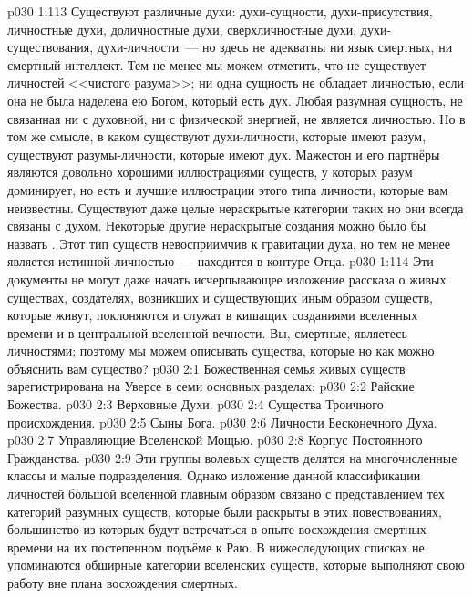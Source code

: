 \vs p030 1:113 Существуют различные духи: духи\hyp{}сущности, духи\hyp{}присутствия, личностные духи, доличностные духи, сверхличностные духи, духи\hyp{}существования, духи\hyp{}личности~--- но здесь не адекватны ни язык смертных, ни смертный интеллект. Тем не менее мы можем отметить, что не существует личностей <<чистого разума>>; ни одна сущность не обладает личностью, если она не была наделена ею Богом, который есть дух. Любая разумная сущность, не связанная ни с духовной, ни с физической энергией, не является личностью. Но в том же смысле, в каком существуют духи\hyp{}личности, которые имеют разум, существуют разумы\hyp{}личности, которые имеют дух. Мажестон и его партнёры являются довольно хорошими иллюстрациями существ, у которых разум доминирует, но есть и лучшие иллюстрации этого типа личности, которые вам неизвестны. Существуют даже целые нераскрытые категории таких  но они всегда связаны с духом. Некоторые другие нераскрытые создания можно было бы назвать . Этот тип существ невосприимчив к гравитации духа, но тем не менее является истинной личностью~--- находится в контуре Отца.
\vs p030 1:114 \pc Эти документы не могут даже начать исчерпывающее изложение рассказа о живых существах, создателях, возникших и существующих иным образом существ, которые живут, поклоняются и служат в кишащих созданиями вселенных времени и в центральной вселенной вечности. Вы, смертные, являетесь личностями; поэтому мы можем описывать существа, которые  но как можно объяснить вам  существо?
\vs p030 2:1 Божественная семья живых существ зарегистрирована на Уверсе в семи основных разделах:
\vs p030 2:2 Райские Божества.
\vs p030 2:3 Верховные Духи.
\vs p030 2:4 Существа Троичного происхождения.
\vs p030 2:5 Сыны Бога.
\vs p030 2:6 Личности Бесконечного Духа.
\vs p030 2:7 Управляющие Вселенской Мощью.
\vs p030 2:8 Корпус Постоянного Гражданства.
\vs p030 2:9 \pc Эти группы волевых существ делятся на многочисленные классы и малые подразделения. Однако изложение данной классификации личностей большой вселенной главным образом связано с представлением тех категорий разумных существ, которые были раскрыты в этих повествованиях, большинство из которых будут встречаться в опыте восхождения смертных времени на их постепенном подъёме к Раю. В нижеследующих списках не упоминаются обширные категории вселенских существ, которые выполняют свою работу вне плана восхождения смертных.
